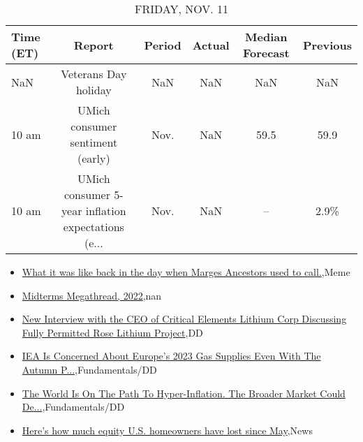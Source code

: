 \documentclass{article}%
\begin{document}
%


\begin{table}[htbp]%
\caption{FRIDAY, NOV. 11}%
\centering%
\begin{adjustbox}{width=1\textwidth}%
\begin{tabular}{lccccc}
\toprule
Time (ET) &                                             Report & Period & Actual & Median Forecast & Previous \\
\midrule
      NaN &                               Veterans Day holiday &    NaN &    NaN &             NaN &      NaN \\
    10 am &                   UMich consumer sentiment (early) &   Nov. &    NaN &            59.5 &     59.9 \\
    10 am & UMich consumer 5-year inflation expectations (e... &   Nov. &    NaN &              -- &     2.9\% \\
\bottomrule
\end{tabular}
%
\end{adjustbox}%
\end{table}

%
\begin{itemize}%
\item%
\href{https://reddit.com/r/wallstreetbets/comments/ypkx9b/what\_it\_was\_like\_back\_in\_the\_day\_when\_marges/}{What it was like back in the day when Marges Ancestors used to call.},Meme%
\item%
\href{https://reddit.com/r/wallstreetbets/comments/ypkdt6/midterms\_megathread\_2022/}{Midterms Megathread, 2022},nan%
\item%
\href{https://reddit.com/r/Baystreetbets/comments/yp868t/new\_interview\_with\_the\_ceo\_of\_critical\_elements/}{New Interview with the CEO of Critical Elements Lithium Corp Discussing Fully Permitted Rose Lithium Project},DD%
\item%
\href{https://reddit.com/r/StockMarket/comments/ypinvh/iea\_is\_concerned\_about\_europes\_2023\_gas\_supplies/}{IEA Is Concerned About Europe's 2023 Gas Supplies Even With The Autumn P...},Fundamentals/DD%
\item%
\href{https://reddit.com/r/StockMarket/comments/ypifmk/the\_world\_is\_on\_the\_path\_to\_hyperinflation\_the/}{The World Is On The Path To Hyper-Inflation. The Broader Market Could De...},Fundamentals/DD%
\item%
\href{https://reddit.com/r/Economics/comments/ypght3/heres\_how\_much\_equity\_us\_homeowners\_have\_lost/}{Here's how much equity U.S. homeowners have lost since May},News%
\end{itemize}%
\end{document}
